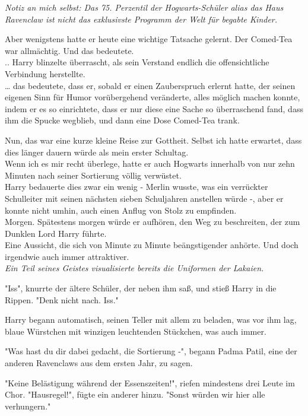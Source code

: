 {\emph{Notiz an mich selbst: Das 75. Perzentil der Hogwarts-Schüler alias das Haus Ravenclaw ist nicht das exklusivste Programm der Welt für begabte Kinder.}

Aber wenigstens hatte er heute eine wichtige Tatsache gelernt. Der Comed-Tea war allmächtig. Und das bedeutete.\\ .. Harry blinzelte überrascht, als sein Verstand endlich die offensichtliche\\ Verbindung herstellte.\\ … das bedeutete, dass er, sobald er einen Zauberspruch erlernt hatte, der seinen eigenen Sinn für Humor vorübergehend veränderte, alles möglich machen konnte, indem er es so einrichtete, dass er nur diese eine Sache so überraschend fand, dass ihm die Spucke wegblieb, und dann eine Dose Comed-Tea trank.

Nun, das war eine kurze kleine Reise zur Gottheit. Selbst ich hatte erwartet, dass dies länger dauern würde als mein erster Schultag.\\ Wenn ich es mir recht überlege, hatte er auch Hogwarts innerhalb von nur zehn Minuten nach seiner Sortierung völlig verwüstet.\\ Harry bedauerte dies zwar ein wenig - Merlin wusste, was ein verrückter Schulleiter mit seinen nächsten sieben Schuljahren anstellen würde -, aber er konnte nicht umhin, auch einen Anflug von Stolz zu empfinden.\\ Morgen. Spätestens morgen würde er aufhören, den Weg zu beschreiten, der zum Dunklen Lord Harry führte.\\ Eine Aussicht, die sich von Minute zu Minute beängstigender anhörte. Und doch irgendwie auch immer attraktiver.\\ \emph{Ein Teil seines Geistes visualisierte bereits die Uniformen der Lakaien.}

"Iss", knurrte der ältere Schüler, der neben ihm saß, und stieß Harry in die Rippen. "Denk nicht nach. Iss."

Harry begann automatisch, seinen Teller mit allem zu beladen, was vor ihm lag, blaue Würstchen mit winzigen leuchtenden Stückchen, was auch immer.

"Was hast du dir dabei gedacht, die Sortierung -", begann Padma Patil, eine der anderen Ravenclaws aus dem ersten Jahr, zu sagen.

"Keine Belästigung während der Essenszeiten!", riefen mindestens drei Leute im Chor. "Hausregel!", fügte ein anderer hinzu. "Sonst würden wir hier alle verhungern."

}
